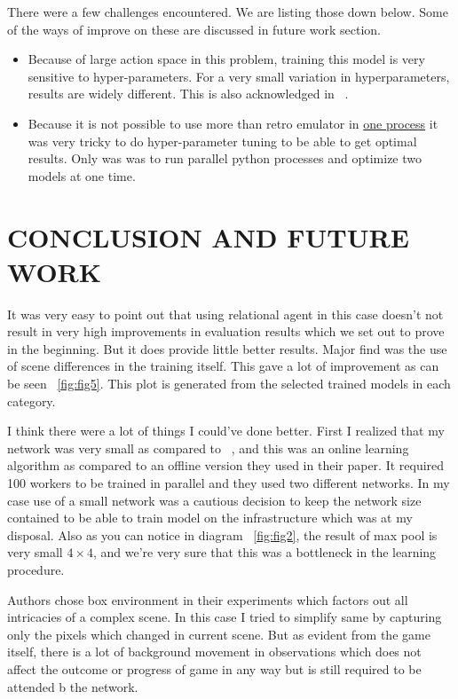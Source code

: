 \documentclass[english]{sobraep}
\begin{document}
There were a few challenges encountered. We are listing those down below. Some of the ways of improve on these are discussed in future work section.

\begin{itemize}
    \item Because of large action space in this problem, training this model is very sensitive to hyper-parameters. For a very small variation in hyperparameters, results are widely different. This is also acknowledged in ~\cite{zambaldi2018deep}.
    
    \item Because it is not possible to use more than retro emulator in \href{https://github.com/openai/retro/issues/64}{one process} it was very tricky to do hyper-parameter tuning to be able to get optimal results. Only was was to run parallel python processes and optimize two models at one time.
    
\end{itemize}

\section{CONCLUSION AND FUTURE WORK}

It was very easy to point out that using relational agent in this case doesn't not result in very high improvements in evaluation results which we set out to prove in the beginning. But it does provide little better results. Major find was the use of scene differences in the training itself. This gave a lot of improvement as can be seen ~\ref{fig:fig5}. This plot is generated from the selected trained models in each category.

I think there were a lot of things I could've done better. First I realized that my network was very small as compared to  ~\cite{zambaldi2018deep}, and this was an online learning algorithm as compared to an offline version they used in their paper. It required 100 workers to be trained in parallel and they used two different networks. In my case use of a small network was a cautious decision to keep the network size contained to be able to train model on the infrastructure which was at my disposal. Also as you can notice in diagram ~\ref{fig:fig2}, the result of max pool is very small $4\times4$, and we're very sure that this was a bottleneck in the learning procedure. 

Authors chose box environment in their experiments which factors out all intricacies of a complex scene. In this case I tried to simplify same by capturing only the pixels which changed in current scene. But as evident from the game itself, there is a lot of background movement in observations which does not affect the outcome or progress of game in any way but is still required to be attended b the network.
\end{document}
